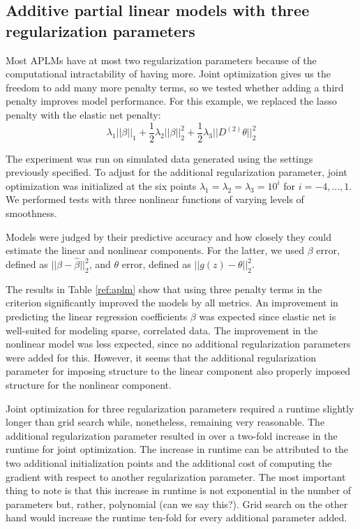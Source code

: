 \documentclass[10pt,letterpaper]{article}
\begin{document}
\subsection{Additive partial linear models with three regularization parameters}
Most APLMs have at most two regularization parameters because of the computational intractability of having more. Joint optimization gives us the freedom to add many more penalty terms, so we tested whether adding a third penalty improves model performance. For this example, we replaced the lasso penalty with the elastic net penalty:
\begin{equation}
\lambda_1 \lvert\lvert \beta \rvert \rvert_1
+ \frac{1}{2} \lambda_2 \lvert\lvert \beta \rvert \rvert_2^2
+ \frac{1}{2} \lambda_3 \lvert\lvert D^{(2)} \theta \rvert \rvert_2^2
\end{equation}

The experiment was run on simulated data generated using the settings previously specified. To adjust for the additional regularization parameter, joint optimization was initialized at the six points $\lambda_1 = \lambda_2 = \lambda_3 =10^i$ for $i=-4, ..., 1$. We performed tests with three nonlinear functions of varying levels of smoothness.

Models were judged by their predictive accuracy and how closely they could estimate the linear and nonlinear components. For the latter, we used $\beta$ error, defined as $||\beta - \hat \beta||_2^2$, and $\theta$ error, defined as $|| g(z) - \theta ||_2^2$.

The results in Table \ref{ref:aplm} show that using three penalty terms in the criterion significantly improved the models by all metrics. An improvement in predicting the linear regression coefficients $\beta$ was expected since elastic net is well-suited for modeling sparse, correlated data. The improvement in the nonlinear model was less expected, since no additional regularization parameters were added for this. However, it seems that the additional regularization parameter for imposing structure to the linear component also properly imposed structure for the nonlinear component.

Joint optimization for three regularization parameters required a runtime slightly longer than grid search while, nonetheless, remaining very reasonable. The additional regularization parameter resulted in over a two-fold increase in the runtime for joint optimization. The increase in runtime can be attributed to the two additional initialization points and the additional cost of computing the gradient with respect to another regularization parameter. The most important thing to note is that this increase in runtime is not exponential in the number of parameters but, rather, polynomial (can we say this?). Grid search on the other hand would increase the runtime ten-fold for every additional parameter added.
\end{document}
